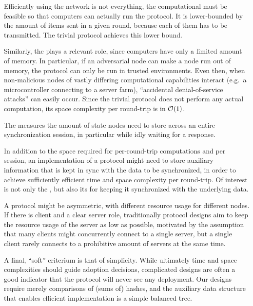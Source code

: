 Efficiently using the network is not everything, the computational
 must be feasible so that
computers can actually run the protocol. It is lower-bounded by the
amount of items sent in a given round, because each of them has to be transmitted. The trivial protocol achieves this lower bound.

Similarly, the  plays a relevant
role, since computers have only a limited amount of memory. In
particular, if an adversarial node can make a node run out of memory,
the protocol can only be run in trusted environments. Even then, when
non-malicious nodes of vastly differing computational capabilities
interact (e.g.~a microcontroller connecting to a server farm),
``accidental denial-of-service attacks'' can easily occur. Since the
trivial protocol does not perform any actual computation, its space
complexity per round-trip is in $\mathcal{O}(1)$.

The  measures the amount of state
nodes need to store across an entire synchronization session, in particular
while idly waiting for a response.

In addition to the space required for per-round-trip computations and per session, an
implementation of a protocol might need to store auxiliary information
that is kept in sync with the data to be synchronized, in order to
achieve sufficiently efficient time and space complexity per round-trip.
Of interest is not only the , but also its  for keeping it
synchronized with the underlying data.

A protocol might be asymmetric, with different resource usage for different nodes.
If there is client and a clear server role, traditionally protocol designs aim to
keep the resource usage of the server as low as possible, motivated by the assumption
that many clients might concurrently connect to a single server, but a single client rarely
connects to a prohibitive amount of servers at the same time.

A final, ``soft'' criterium is that of simplicity. While ultimately time
and space complexities should guide adoption decisions, complicated
designs are often a good indicator that the protocol will never see any
deployment. Our designs require merely comparisons of (sums of) hashes,
and the auxiliary data structure that enables efficient implementation
is a simple balanced tree.

